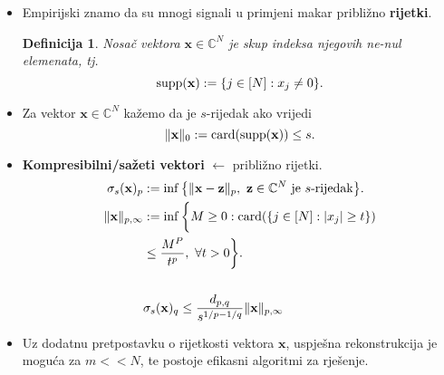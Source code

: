 \documentclass{beamer}
\newtheorem{thm}{Teorem}[section]
\newtheorem{defn}[thm]{Definicija}
\newcommand{\C}{\mathbb{C}}
\newcommand{\vect}[1]{\mathbf{#1}}
\renewcommand{\vec}{\vect}
\newcommand{\card}{\text{\normalfont{card}}}
\newcommand{\supp}{\text{\normalfont{supp}}}
\begin{document}
\begin{frame}
\end{frame}

\begin{frame}
    \begin{itemize}
        \item Empirijski znamo da su mnogi signali u primjeni makar pribli\v{z}no \textbf{rijetki}. 
\begin{defn}
    Nosa\v{c} vektora $\vec{x} \in \C^{N}$ je skup indeksa njegovih ne-nul elemenata, tj.
    $$\supp(\vec{x}):=\{j\in[N]:x_j \neq 0 \}.$$
\end{defn}
\item Za vektor $\vec{x}\in\C^{N}$ ka\v{z}emo da je $s$-rijedak ako vrijedi $$\|\vec{x}\|_0 := \card(\supp(\vec{x})) \leq s.$$
    \end{itemize}
\end{frame}

\begin{frame}
    \begin{itemize}
        \item \textbf{Kompresibilni/sa\v{z}eti vektori} $\leftarrow$ pribli\v{z}no rijetki.
    \begin{align*}
        \sigma_s(\vec{x})_p &:= \inf\big\{\|\vec{x}-\vec{z}\|_p,\ \vec{z} \in \C^{N} \ \text{je $s$-rijedak}\big\}.\\
        \|\vec{x}\|_{p, \infty}&:=\inf\bigg\{ M \geq 0: \card (\{j\in [N]: |x_j|\geq t \})\\
        &\leq \frac{M^P}{t^p},\ \forall t>0    \bigg\}.\\
            &\\
        &\sigma_s(\vec{x})_q \leq \frac{d_{p,q}}{s^{1/p-1/q}}\|\vec{x}\|_{p, \infty}
    \end{align*}
\item Uz dodatnu pretpostavku o rijetkosti vektora $\vec x$, uspje\v{s}na rekonstrukcija je mogu\'ca za $m << N$, te postoje efikasni algoritmi za rje\v{s}enje.
    \end{itemize}
\end{frame}
\end{document}

